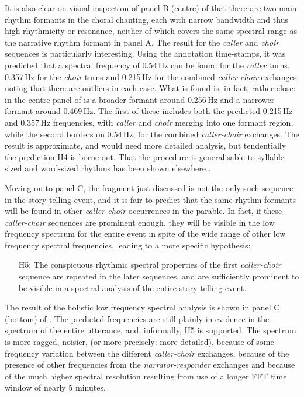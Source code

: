 \documentclass[output=paper,colorlinks,citecolor=brown]{langscibook}
\begin{document}
It is also clear on visual inspection of panel B (centre) of  that there are two main rhythm formants in the choral chanting, each with narrow bandwidth and thus high rhythmicity or resonance, neither of which covers the same spectral range as the narrative rhythm formant in panel A. The result for the \textit{caller} and \textit{choir} sequences is particularly interesting. Using the annotation time-stamps, it was predicted that a spectral frequency of 0.54\,Hz can be found for the \textit{caller} turns, 0.357\,Hz for the \textit{choir} turns and 0.215\,Hz for the combined \textit{caller-choir} exchanges, noting that there are outliers in each case. What is found is, in fact, rather close: in the centre panel of  is a broader formant around 0.256\,Hz and a narrower formant around 0.469\,Hz. The first of these includes both the predicted 0.215\,Hz and 0.357\,Hz frequencies, with \textit{caller} and \textit{choir} merging into one formant region, while the second borders on 0.54\,Hz, for the combined \textit{caller-choir} exchanges. The result is approximate, and would need more detailed analysis, but tendentially the prediction H4 is borne out. That the procedure is generalisable to syllable-sized and word-sized rhythms has been shown elsewhere \citep{gibbonjipa2021}.

Moving on to panel C, the fragment just discussed is not the only such sequence in the story-telling event, and it is fair to predict that the same rhythm formants will be found in other \textit{caller-choir} occurrences in the parable. In fact, if these \textit{caller-choir} sequences are prominent enough, they will be visible in the low frequency spectrum for the entire event in spite of the wide range of other low frequency spectral frequencies, leading to a more specific hypothesis:

\begin{itemize}
    \item[H5:] The conspicuous rhythmic spectral properties of the first \textit{caller-choir} sequence are repeated in the later sequences, and are sufficiently prominent to be visible in a spectral analysis of the entire story-telling event.
\end{itemize}

The result of the holistic low frequency spectral analysis is shown in panel C (bottom) of . The predicted frequencies are still plainly in evidence in the spectrum of the entire utterance, and, informally, H5 is supported. The spectrum is more ragged, noisier, (or more precisely: more detailed), because of some frequency variation between the different \textit{caller-choir} exchanges, because of the presence of other frequencies from the \textit{narrator-responder} exchanges and because of the much higher spectral resolution resulting from use of a longer FFT time window of nearly 5 minutes.
\end{document}
